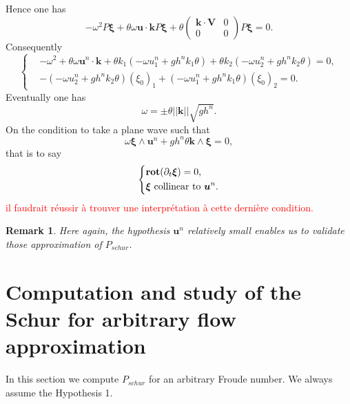 \documentclass[a4paper, 11pt]{report}
\newtheorem{Remark}{Remark}
\begin{document}
Hence one has
\begin{equation*}
-\omega^2P\boldsymbol{\xi}+\theta\omega \boldsymbol{u}\cdot \boldsymbol{k}P\boldsymbol{\xi}+\theta\begin{pmatrix}\boldsymbol{k}\cdot \boldsymbol{V}&0\\0&0\end{pmatrix}P\boldsymbol{\xi}=0.
\end{equation*}
Consequently
\begin{equation*}
\left\{\begin{split}
&-\omega^2+\theta\omega \boldsymbol{u}^n\cdot \boldsymbol{k}+\theta k_1(-\omega u_1^n+gh^nk_1\theta)+\theta k_2(-\omega u_2^n+gh^nk_2\theta)=0,\\
&-(-\omega u_2^n+gh^nk_2\theta)(\xi_0)_1+(-\omega u_1^n+gh^nk_1\theta)(\xi_0)_2=0.
\end{split}
\right.
\end{equation*}
Eventually one has
\begin{equation*}
\omega=\pm\theta||\boldsymbol{k}||\sqrt{gh^n}.
\end{equation*}
On the condition to take a plane wave such that 
\begin{equation*}
\omega \boldsymbol{\xi}\wedge\boldsymbol{u}^n+gh^n\theta\boldsymbol{k}\wedge\boldsymbol{\xi}=0,
\end{equation*}
that is to say
\begin{equation*}
\left\{\begin{split}
&\text{\textbf{rot}}(\partial_t \boldsymbol{\xi})=0,\\
&\boldsymbol{\xi}\text{\ collinear\ to\ }\boldsymbol{u}^n.
\end{split}\right.
\end{equation*}
\textcolor{red}{il faudrait r\'eussir \`a trouver une interpr\'etation \`a cette derni\`ere condition.}
\begin{Remark}
Here again, the hypothesis $\boldsymbol{u}^n$ relatively small enables us to validate those approximation of $P_{schur}$.
\end{Remark}
 
\section{Computation and study of the Schur for arbitrary  flow approximation}
In this section we compute $P_{schur}$ for an arbitrary Froude number. We always assume the Hypothesis 1.
\end{document}
